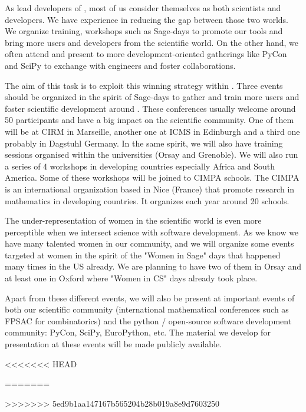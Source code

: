 \begin{workpackage}
\begin{tasklist}
\begin{task}[title=Dissemination: reaching users and diversity, lead=PS,PM=6, partners={UB,USH,SA,UO}, id=dissemination]
  As lead developers of \TheProject, most of us consider themselves as
  both scientists and developers. We have experience in reducing the
  gap between those two worlds. We organize training, workshops such
  as Sage-days to promote our tools and bring more users and
  developers from the scientific world. On the other hand, we often
  attend and present to more development-oriented gatherings like
  PyCon and SciPy to exchange with engineers and foster
  collaborations.

  The aim of this task is to exploit this winning strategy within
  \TheProject. Three events should be organized in the spirit of
  Sage-days to gather and train more users and foster scientific
  development around \TheProject. These conferences usually welcome
  around 50 participants and have a big impact on the scientific
  community. One of them will be at CIRM in Marseille, another one at
  ICMS in Edinburgh and a third one probably in Dagstuhl Germany. In
  the same spirit, we will also have training sessions organised
  within the universities (Orsay and Grenoble). We will also run a
  series of 4 workshops in developing countries especially Africa and
  South America. Some of these workshops will be joined to CIMPA
  schools.  The CIMPA is an international organization based in Nice
  (France) that promote research in mathematics in developing
  countries. It organizes each year around 20 schools.

  The under-representation of women in the scientific world is even
  more perceptible when we intersect science with software
  development. As we know we have many talented women in our
  community, and we will organize some events targeted at women in the
  spirit of the "Women in Sage" days that happened many times in the
  US already. We are planning to have two of them in Orsay and at least
  one in Oxford where "Women in CS" days already took place.

  Apart from these different events, we will also be present at
  important events of both our scientific community (international
  mathematical conferences such as FPSAC for combinatorics) and the
  python / open-source software development community: PyCon, SciPy,
  EuroPython, etc. The material we develop for presentation at these
  events will be made publicly available.
\end{task}


<<<<<<< HEAD
\begin{task}[title=Introduce \TheProject to Researchers and Teachers, id=project-intro,lead=USH,PM=14]
=======
\begin{task}[title=Introduce \TheProject to Researchers and Teachers, id=project-intro,lead=USH,PM=20,partners={USO}]
>>>>>>> 5ed9b1aa147167b565204b28b019a8e9d7603250


\end{task}
\end{task}
\end{tasklist}
\end{workpackage}
